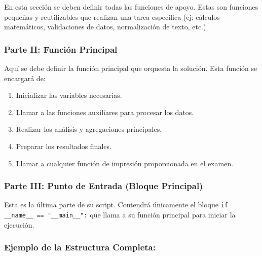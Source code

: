 \documentclass[11pt,a4paper]{article}
\begin{document}
En esta sección se deben definir todas las funciones de apoyo. Estas son funciones pequeñas y reutilizables que realizan una tarea específica (ej: cálculos matemáticos, validaciones de datos, normalización de texto, etc.).

\subsubsection{Parte II: Función Principal}

Aquí se debe definir la función principal que orquesta la solución. Esta función se encargará de:

\begin{enumerate}[leftmargin=*]
    \item Inicializar las variables necesarias.
    \item Llamar a las funciones auxiliares para procesar los datos.
    \item Realizar los análisis y agregaciones principales.
    \item Preparar los resultados finales.
    \item Llamar a cualquier función de impresión proporcionada en el examen.
\end{enumerate}

\subsubsection{Parte III: Punto de Entrada (Bloque Principal)}

Esta es la última parte de su script. Contendrá únicamente el bloque \texttt{if \_\_name\_\_ == "\_\_main\_\_":} que llama a su función principal para iniciar la ejecución.

\subsubsection{Ejemplo de la Estructura Completa:}
\end{document}
